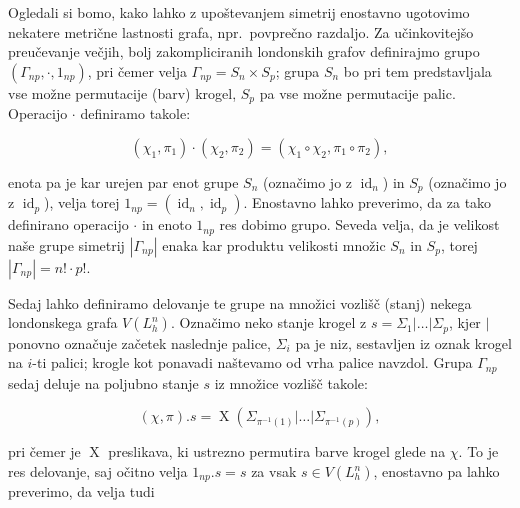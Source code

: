 \documentclass[12pt,a4paper]{amsart}
\theoremstyle{definition} %
\theoremstyle{plain} %
\DeclareMathOperator {\id} {id}
\DeclareMathOperator {\X}{X}
\begin{document}

Ogledali si bomo, kako lahko z upoštevanjem simetrij enostavno ugotovimo nekatere metrične lastnosti grafa, npr.~povprečno razdaljo. Za učinkovitejšo preučevanje večjih, bolj zakompliciranih londonskih grafov definirajmo grupo $(\Gamma_{np}, \cdot, 1_{np})$, pri čemer velja $\Gamma_{np} = S_n \times S_p$; grupa $S_n$ bo pri tem predstavljala vse možne permutacije (barv) krogel, $S_p$ pa vse možne permutacije palic. Operacijo $\cdot$ definiramo takole:

\[ (\chi_1,\pi_1) \cdot (\chi_2,\pi_2) = (\chi_1 \circ \chi_2,\pi_1 \circ \pi_2), \]

enota pa je kar urejen par enot grupe $S_n$ (označimo jo z $\id_n$) in $S_p$ (označimo jo z $\id_p$), velja torej $1_{np} = (\id_n, \id_p) $. Enostavno lahko preverimo, da za tako definirano operacijo $\cdot$ in enoto $1_{np}$ res dobimo grupo. Seveda velja, da je velikost naše grupe simetrij $|\Gamma_{np}|$ enaka kar produktu velikosti množic $S_n$ in $S_p$, torej $|\Gamma_{np}| = n! \cdot p!$. 

Sedaj lahko definiramo delovanje te grupe na množici vozlišč (stanj) nekega londonskega grafa $V(L_h^n)$. Označimo neko stanje krogel z $s = \Sigma_1 | \ldots | \Sigma_p$, kjer $|$ ponovno označuje začetek naslednje palice, $\Sigma_i$ pa je niz, sestavljen iz oznak krogel na $i$-ti palici; krogle kot ponavadi naštevamo od vrha palice navzdol. Grupa $\Gamma_{np}$ sedaj deluje na poljubno stanje $s$ iz množice vozlišč takole:

\[ (\chi,\pi) . s = \X \left( \Sigma_{\pi^{-1}(1)} | \ldots | \Sigma_{\pi^{-1}(p)} \right), \]

pri čemer je $\X$ preslikava, ki ustrezno permutira barve krogel glede na $\chi$. To je res delovanje, saj očitno velja $1_{np}.s = s$ za vsak $s \in V(L_h^n)$, enostavno pa lahko preverimo, da velja tudi
\end{document}
